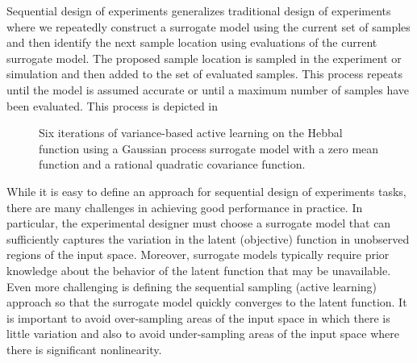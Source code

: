 \documentclass[conference]{IEEEtran}
\begin{document}
	Sequential design of experiments generalizes traditional design of experiments where we repeatedly construct a surrogate model using the current set of samples and then identify the next sample location using evaluations of the current surrogate model. The proposed sample location is sampled in the experiment or simulation and then added to the set of evaluated samples. This process repeats until the model is assumed accurate or until a maximum number of samples have been evaluated. This process is depicted in 
	
	\begin{figure}[htbp]
	    \centering
	     \hspace*{-1.5em}
	    
	     \hspace*{-1.5em}
	    
	     \hspace*{-1.5em}
	    
	    \caption{Six iterations of variance-based active learning on the Hebbal function \cite{hebbal2019bayesian} using a Gaussian process surrogate model with a zero mean function and a rational quadratic covariance function.}
	    \label{fig:sdoe_diagram}
	\end{figure}
	
	While it is easy to define an approach for sequential design of experiments tasks, there are many challenges in achieving good performance in practice. In particular, the experimental designer must choose a surrogate model that can sufficiently captures the variation in the latent (objective) function in unobserved regions of the input space. Moreover, surrogate models typically require prior knowledge about the behavior of the latent function that may be unavailable. Even more challenging is defining the sequential sampling (active learning) approach so that the surrogate model quickly converges to the latent function. It is important to avoid over-sampling areas of the input space in which there is little variation and also to avoid under-sampling areas of the input space where there is significant nonlinearity.
	
\end{document}
